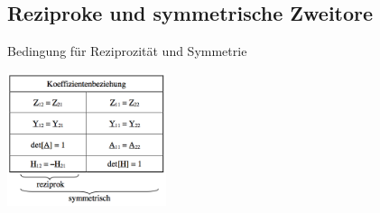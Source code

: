 
\begin{multicols}{2}
\subsection{Reziproke und symmetrische Zweitore}
	Bedingung für Reziprozität und Symmetrie\\
	\begin{minipage}{4cm}
		\includegraphics[height=3.9cm]{./bilder/Rezipro_Sym_Bedingung}\\
	\end{minipage}
			
	\columnbreak
	

\end{multicols}
